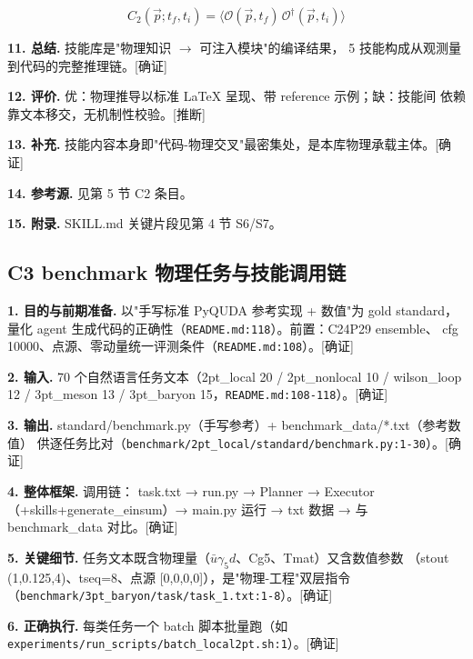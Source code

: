 \documentclass[UTF8]{ctexart}
\begin{document}
\begin{equation}\label{eq:corr}
C_2(\vec{p};t_f,t_i)=\langle \mathcal{O}(\vec{p},t_f)\,\mathcal{O}^\dagger(\vec{p},t_i)\rangle
\end{equation}

\noindent\textbf{11. 总结.} 技能库是"物理知识 $\rightarrow$ 可注入模块"的编译结果，
5 技能构成从观测量到代码的完整推理链。[确证]

\noindent\textbf{12. 评价.} 优：物理推导以标准 LaTeX 呈现、带 reference 示例；缺：技能间
依赖靠文本移交，无机制性校验。[推断]

\noindent\textbf{13. 补充.} 技能内容本身即"代码-物理交叉"最密集处，是本库物理承载主体。[确证]

\noindent\textbf{14. 参考源.} 见第 5 节 C2 条目。

\noindent\textbf{15. 附录.} SKILL.md 关键片段见第 4 节 S6/S7。

\subsection{C3 benchmark 物理任务与技能调用链}

\noindent\textbf{1. 目的与前期准备.} 以"手写标准 PyQUDA 参考实现 + 数值"为 gold standard，
量化 agent 生成代码的正确性（\texttt{\nolinkurl{README.md:118}}）。前置：C24P29 ensemble、
cfg 10000、点源、零动量统一评测条件（\texttt{\nolinkurl{README.md:108}}）。[确证]

\noindent\textbf{2. 输入.} 70 个自然语言任务文本（2pt\_local 20 / 2pt\_nonlocal 10 /
wilson\_loop 12 / 3pt\_meson 13 / 3pt\_baryon 15，\texttt{\nolinkurl{README.md:108-118}}）。[确证]

\noindent\textbf{3. 输出.} standard/benchmark.py（手写参考）+ benchmark\_data/*.txt（参考数值）
供逐任务比对（\texttt{\nolinkurl{benchmark/2pt_local/standard/benchmark.py:1-30}}）。[确证]

\noindent\textbf{4. 整体框架.} 调用链：
\textcolor{map}{task.txt → run.py → Planner → Executor（+skills+generate\_einsum）→
main.py 运行 → txt 数据 → 与 benchmark\_data 对比}。[确证]

\noindent\textbf{5. 关键细节.} 任务文本既含物理量（$\bar u\gamma_5 d$、Cg5、Tmat）又含数值参数
（stout (1,0.125,4)、tseq=8、点源 [0,0,0,0]），是"物理-工程"双层指令
（\texttt{\nolinkurl{benchmark/3pt_baryon/task/task_1.txt:1-8}}）。[确证]

\noindent\textbf{6. 正确执行.} 每类任务一个 batch 脚本批量跑（如
\texttt{\nolinkurl{experiments/run_scripts/batch_local2pt.sh:1}}）。[确证]
\end{document}
